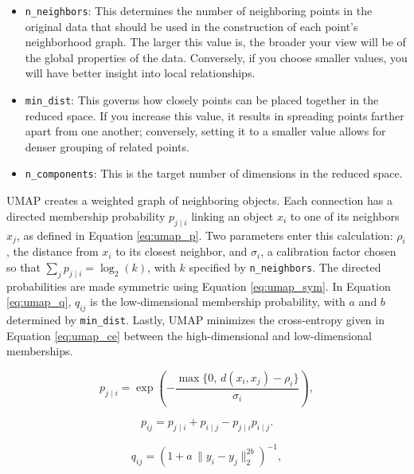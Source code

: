 \begin{itemize}

    \item \texttt{n\_neighbors}: This determines the number of neighboring points in the original data that should be used in the construction of each point's neighborhood graph. The larger this value is, the broader your view will be of the global properties of the data. Conversely, if you choose smaller values, you will have better insight into local relationships.

    \item \texttt{min\_dist}: This governs how closely points can be placed together in the reduced space. If you increase this value, it results in spreading points farther apart from one another; conversely, setting it to a smaller value allows for denser grouping of related points.

    \item \texttt{n\_components}: This is the target number of dimensions in the reduced space.

\end{itemize}

UMAP creates a weighted graph of neighboring objects. Each connection has a directed membership probability \(p_{j\mid i}\) linking an object \(x_i\) to one of its neighbors \(x_j\), as defined in Equation \ref{eq:umap_p}. Two parameters enter this calculation: \(\rho_i\), the distance from \(x_i\) to its closest neighbor, and \(\sigma_i\), a calibration factor chosen so that \(\sum_j p_{j\mid i}=\log_2(k)\), with \(k\) specified by \texttt{n\_neighbors}. The directed probabilities are made symmetric using Equation \ref{eq:umap_sym}. In Equation \ref{eq:umap_q}, \(q_{ij}\) is the low-dimensional membership probability, with \(a\) and \(b\) determined by \texttt{min\_dist}. Lastly, UMAP minimizes the cross-entropy given in Equation \ref{eq:umap_ce} between the high-dimensional and low-dimensional memberships.

\begin{equation}\label{eq:umap_p}
p_{j\mid i}=\exp\!\left(-\frac{\max\{0,\,d(x_i,x_j)-\rho_i\}}{\sigma_i}\right),
\end{equation}

\begin{equation}\label{eq:umap_sym}
p_{ij}=p_{j\mid i}+p_{i\mid j}-p_{j\mid i}p_{i\mid j}.
\end{equation}

\begin{equation}\label{eq:umap_q}
q_{ij}=\left(1+a\,\lVert y_i-y_j\rVert_2^{2b}\right)^{-1},
\end{equation}

